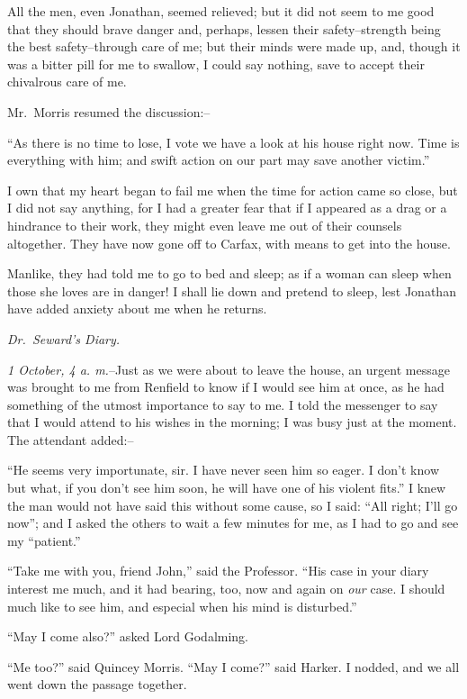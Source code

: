 \documentclass[12pt,openright]{book}
\begin{document}
All the men, even Jonathan, seemed relieved; but it did not seem to me good that they should brave danger and, perhaps, lessen their safety–strength being the best safety–through care of me; but their minds were made up, and, though it was a bitter pill for me to swallow, I could say nothing, save to accept their chivalrous care of me.

Mr. Morris resumed the discussion:–

“As there is no time to lose, I vote we have a look at his house right now. Time is everything with him; and swift action on our part may save another victim.”

I own that my heart began to fail me when the time for action came so close, but I did not say anything, for I had a greater fear that if I appeared as a drag or a hindrance to their work, they might even leave me out of their counsels altogether. They have now gone off to Carfax, with means to get into the house.

Manlike, they had told me to go to bed and sleep; as if a woman can sleep when those she loves are in danger! I shall lie down and pretend to sleep, lest Jonathan have added anxiety about me when he returns.

\textit{Dr. Seward’s Diary.}

\textit{1 October, 4 a. m.}–Just as we were about to leave the house, an urgent message was brought to me from Renfield to know if I would see him at once, as he had something of the utmost importance to say to me. I told the messenger to say that I would attend to his wishes in the morning; I was busy just at the moment. The attendant added:–

“He seems very importunate, sir. I have never seen him so eager. I don’t know but what, if you don’t see him soon, he will have one of his violent fits.” I knew the man would not have said this without some cause, so I said: “All right; I’ll go now”; and I asked the others to wait a few minutes for me, as I had to go and see my “patient.”

“Take me with you, friend John,” said the Professor. “His case in your diary interest me much, and it had bearing, too, now and again on \textit{our} case. I should much like to see him, and especial when his mind is disturbed.”

“May I come also?” asked Lord Godalming.

“Me too?” said Quincey Morris. “May I come?” said Harker. I nodded, and we all went down the passage together.
\end{document}
